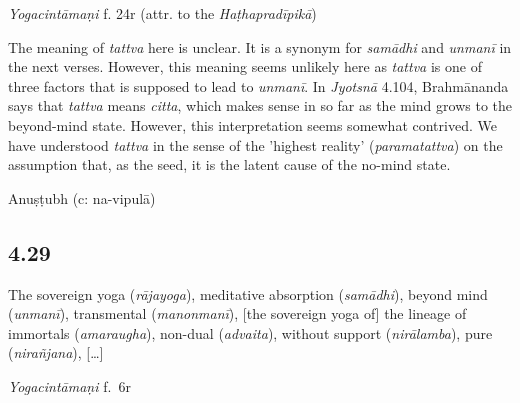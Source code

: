 \begin{ekdosis}

\begin{testimonia}[hp04_028]
\emph{Yogacintāmaṇi} f. 24r (attr. to the \emph{Haṭhapradīpikā})
\begin{versinnote}
\end{versinnote}
\end{testimonia}

\begin{philcomm}[hp04_028]
The meaning of \emph{tattva} here is unclear. It is a synonym for \emph{samādhi} and \emph{unmanī} in the next verses. However, this meaning seems unlikely here as \emph{tattva} is one of three factors that is supposed to lead to \emph{unmanī}. In \emph{Jyotsnā} 4.104, Brahmānanda says that \emph{tattva} means \emph{citta}, which makes sense in so far as the mind grows to the beyond-mind state. However, this interpretation seems somewhat contrived. We have understood \emph{tattva} in the sense of the 'highest reality' (\emph{paramatattva}) on the assumption that, as the seed, it is the latent cause of the no-mind state.

\end{philcomm}

\begin{metre}[hp04_028]
Anuṣṭubh (c: na-vipulā)
\end{metre}

\subsection*{4.29}
\begin{translation}[hp04_029]
The sovereign yoga (\emph{rājayoga}), meditative absorption (\emph{samādhi}), beyond mind (\emph{unmanī}), transmental (\textit{manonmanī}), [the sovereign yoga of] the lineage of immortals (\emph{amaraugha}), non-dual (\emph{advaita}), without support (\emph{nirālamba}), pure (\emph{nirañjana}), [\dots]
\end{translation}
% 


\begin{testimonia}[hp04_029]
\emph{Yogacintāmaṇi} f.~6r
\begin{versinnote}
\end{versinnote}


\end{testimonia}
\end{ekdosis}
